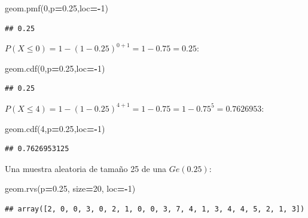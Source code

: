 \documentclass[]{book}
\newenvironment{Shaded}{\begin{snugshade}}{\end{snugshade}}
\newcommand{\DecValTok}[1]{\textcolor[rgb]{0.00,0.00,0.81}{#1}}
\newcommand{\FloatTok}[1]{\textcolor[rgb]{0.00,0.00,0.81}{#1}}
\newcommand{\NormalTok}[1]{#1}
\newcommand{\OperatorTok}[1]{\textcolor[rgb]{0.81,0.36,0.00}{\textbf{#1}}}
\begin{document}
\begin{Shaded}
\begin{Highlighting}[]
\NormalTok{geom.pmf(}\DecValTok{0}\NormalTok{,p}\OperatorTok{=}\FloatTok{0.25}\NormalTok{,loc}\OperatorTok{=-}\DecValTok{1}\NormalTok{)}
\end{Highlighting}
\end{Shaded}

\begin{verbatim}
## 0.25
\end{verbatim}

\(P(X\leq 0)=1- (1-0.25)^{0+1}=1-0.75=0.25\):

\begin{Shaded}
\begin{Highlighting}[]
\NormalTok{geom.cdf(}\DecValTok{0}\NormalTok{,p}\OperatorTok{=}\FloatTok{0.25}\NormalTok{,loc}\OperatorTok{=-}\DecValTok{1}\NormalTok{)}
\end{Highlighting}
\end{Shaded}

\begin{verbatim}
## 0.25
\end{verbatim}

\(P(X\leq 4)=1-(1-0.25)^{4+1}=1-0.75=1-0.75^5=0.7626953\):

\begin{Shaded}
\begin{Highlighting}[]
\NormalTok{geom.cdf(}\DecValTok{4}\NormalTok{,p}\OperatorTok{=}\FloatTok{0.25}\NormalTok{,loc}\OperatorTok{=-}\DecValTok{1}\NormalTok{)}
\end{Highlighting}
\end{Shaded}

\begin{verbatim}
## 0.7626953125
\end{verbatim}

Una muestra aleatoria de tamaño 25 de una \(Ge(0.25)\):

\begin{Shaded}
\begin{Highlighting}[]
\NormalTok{geom.rvs(p}\OperatorTok{=}\FloatTok{0.25}\NormalTok{, size}\OperatorTok{=}\DecValTok{20}\NormalTok{, loc}\OperatorTok{=-}\DecValTok{1}\NormalTok{)}
\end{Highlighting}
\end{Shaded}

\begin{verbatim}
## array([2, 0, 0, 3, 0, 2, 1, 0, 0, 3, 7, 4, 1, 3, 4, 4, 5, 2, 1, 3])
\end{verbatim}
\end{document}

